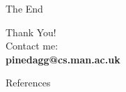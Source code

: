 \documentclass[17pt,mathserif]{beamer}
\begin{document}
    \begin{frame}{The End}
      \begin{center}
          \vspace*{-3em}
          {\Large Thank You!}\\
          \vspace*{0.5em}
          Contact me:\\[1em]
          {\Large \textbf{pinedagg@cs.man.ac.uk}}\\
      \end{center}
    \end{frame}
    
    \begin{frame}{References}
      \vspace*{-3em}
      \printbibliography

    \end{frame}
\end{document}
